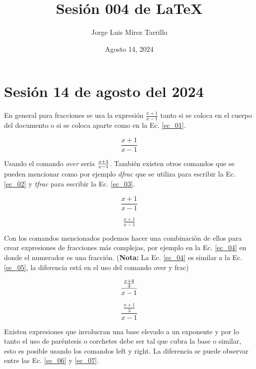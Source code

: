 \documentclass{article}
\title{Sesión 004 de LaTeX}
\author{Jorge Luis Mírez Tarrillo}
\date{Agosto 14, 2024}
\begin{document}
\maketitle

\section*{Sesión 14 de agosto del 2024}

En general para fracciones se usa la expresión $\frac{x + 1}{x - 1}$ tanto si se coloca en el cuerpo del documento o si se coloca aparte como en la Ec. \eqref{ec_01}.

\begin{equation} \label{ec_01}
    \frac{x + 1}{x - 1}
\end{equation}

Usando el comando \textit{over} sería $x + 1 \over x - 1$. También existen otros comandos que se pueden mencionar como por ejemplo \textit{dfrac} que se utiliza para escribir la Ec. \eqref{ec_02} y \textit{tfrac} para escribir la Ec. \eqref{ec_03}.

\begin{equation} \label{ec_02}
    \dfrac{x + 1}{x - 1}
\end{equation}

\begin{equation} \label{ec_03}
    \tfrac{x + 1}{x - 1}
\end{equation}

Con los comandos mencionados podemos hacer una combinación de ellos para crear expresiones de fracciones más complejas, por ejemplo en la Ec. \eqref{ec_04} en donde el numerador es una fracción. (\textbf{Nota:} La Ec. \eqref{ec_04} es similar a la Ec. \eqref{ec_05}, la diferencia está en el uso del comando over y frac) 

\begin{equation} \label{ec_04}
    {{x + 4 \over 3} \over x - 1}
\end{equation}

\begin{equation} \label{ec_05}
    \frac{\frac{x + 1}{3}}{x - 1}
\end{equation}

Existen expresiones que involucran una base elevado a un exponente y por lo tanto el uso de paréntesis o corchetes debe ser tal que cubra la base o similar, esto es posible usando los comandos left y right. La diferencia se puede observar entre las Ec. \eqref{ec_06} y \eqref{ec_07}.
\end{document}
